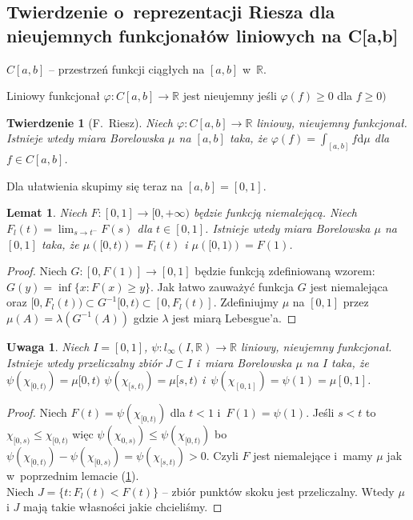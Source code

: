 \documentclass[10pt]{article}
\renewcommand{\[}{\begin{equation}}
\renewcommand{\]}{\end{equation}}
\newcommand{\R}{{\ensuremath{\mathbb R}}}
\newcommand{\dd}{\mathrm{d}}
\newtheorem{twr}[subsubsection]{Twierdzenie}%
\newtheorem{lem}[subsubsection]{Lemat}
\newtheorem{uw}[subsubsection]{Uwaga}
\begin{document}
\subsection{Twierdzenie o~reprezentacji  Riesza dla nieujemnych funkcjonałów liniowych na C[a,b]}
$C[a,b]$ -- przestrzeń funkcji ciągłych na $[a,b]$ w~$\R$.\par
Liniowy funkcjonał $\varphi:C[a,b]\to \R$ jest nieujemny jeśli $\varphi(f)\ge 0$ dla $f \ge 0)$
\begin{twr}[F.~Riesz]
Niech $\varphi:C[a,b]\to \R$ liniowy, nieujemny  funkcjonał.
Istnieje wtedy miara Borelowska $\mu$ na $[a,b]$ taka, że $\varphi(f) = \int_{[a,b]} f \dd \mu$ dla $f\in C[a,b]$.
\end{twr}
Dla ułatwienia skupimy się teraz na $[a,b]=[0,1]$.
\begin{lem} \label{lem:Riesz1}
  Niech $F\colon[0,1]\to [0,+\infty)$ będzie funkcją niemalejącą. Niech $F_l(t) = \lim_{s\to t^-} F(s)$ dla $t\in[0,1]$. 
  Istnieje wtedy miara Borelowska $\mu$ na $[0,1]$
  taka, że $\mu\left( [0,t) \right) = F_{l}(t)$ i $\mu\left( [0,1) \right) = F(1)$.
\end{lem}
\begin{proof}
			Niech $G\colon[0,F(1)] \to [0,1]$ będzie funkcją zdefiniowaną wzorem: $G(y) = \inf\{x: F(x) \ge y\}$.
			Jak łatwo zauważyć funkcja $G$ jest niemalejąca oraz  $[0,F_l(t)) \subset G^{-1}[0,t)\subset [0,F_l(t)]$.
			Zdefiniujmy $\mu$ na $[0,1]$ przez $\mu(A) = \lambda(G^{-1}(A))$ gdzie $\lambda$ jest miarą Lebesgue'a.
\end{proof}
\begin{uw}
	Niech $I=[0,1]$, $\psi: l_\infty (I,\R)\to \R$ liniowy, nieujemny  funkcjonał. 
	Istnieje wtedy  przeliczalny zbiór $J\subset I$ i~miara Borelowska $\mu$ na $I$ taka, że $\psi\left(\chi_{[0,t)} \right) = \mu[0,t)$ 
		$\psi \left( \chi_{[s,t)}  \right)  = \mu[s,t)$ i~$\psi(\chi_{[0,1]}) = \psi(1) = \mu[0,1]$.
\end{uw}
\begin{proof}
	Niech $F(t) = \psi\left( \chi_{[0,t)} \right)$ dla $t<1$ i~$F(1) = \psi(1)$.
	Jeśli $s<t$ to $\chi_{[0,s)} \le \chi_{[0,t)}$ więc $\psi\left( \chi_{0,s)} \right) \le \psi \left( \chi_{[0,t)} \right)$
		bo $\psi (\chi_{[0,t)} ) - \psi (\chi_{[0,s)}) = \psi(\chi_{[s,t)}) >0$.
	Czyli $F$ jest niemalejące i~mamy $\mu$ jak w~poprzednim lemacie (\ref{lem:Riesz1}).\\
	Niech $J= \{t: F_l (t) < F(t)\}$ -- zbiór punktów skoku jest przeliczalny. 
	Wtedy $\mu$ i $J$ mają takie własności jakie chcieliśmy. 
\end{proof}
\end{document}
